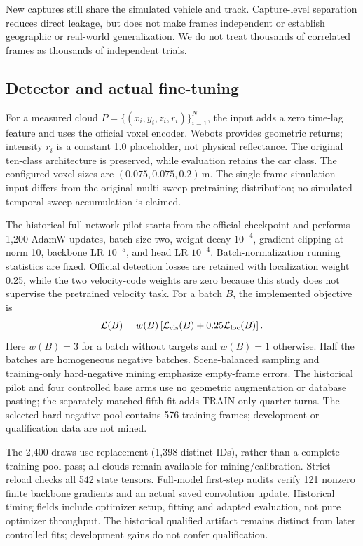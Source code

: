 \documentclass[conference]{IEEEtran}
\begin{document}
New captures still share the simulated vehicle and track. Capture-level separation reduces direct leakage, but does not make frames independent or establish geographic or real-world generalization. We do not treat thousands of correlated frames as thousands of independent trials.

\subsection{Detector and actual fine-tuning}
For a measured cloud $P=\{(x_i,y_i,z_i,r_i)\}_{i=1}^{N}$, the input adds a zero time-lag feature and uses the official voxel encoder. Webots provides geometric returns; intensity $r_i$ is a constant 1.0 placeholder, not physical reflectance. The original ten-class architecture is preserved, while evaluation retains the car class. The configured voxel sizes are $(0.075,0.075,0.2)$\,m. The single-frame simulation input differs from the original multi-sweep pretraining distribution; no simulated temporal sweep accumulation is claimed.

The historical full-network pilot starts from the official checkpoint and performs 1,200 AdamW updates, batch size two, weight decay $10^{-4}$, gradient clipping at norm 10, backbone LR $10^{-5}$, and head LR $10^{-4}$. Batch-normalization running statistics are fixed. Official detection losses are retained with localization weight 0.25, while the two velocity-code weights are zero because this study does not supervise the pretrained velocity task. For a batch $B$, the implemented objective is
\begin{equation}
\mathcal{L}(B)=w(B)\left[\mathcal{L}_{\rm cls}(B)+0.25\mathcal{L}_{\rm loc}(B)\right].
\end{equation}
Here $w(B)=3$ for a batch without targets and $w(B)=1$ otherwise. Half the batches are homogeneous negative batches. Scene-balanced sampling and training-only hard-negative mining emphasize empty-frame errors. The historical pilot and four controlled base arms use no geometric augmentation or database pasting; the separately matched fifth fit adds TRAIN-only quarter turns. The selected hard-negative pool contains 576 training frames; development or qualification data are not mined.

The 2,400 draws use replacement (1,398 distinct IDs), rather than a complete training-pool pass; all clouds remain available for mining/calibration. Strict reload checks all 542 state tensors. Full-model first-step audits verify 121 nonzero finite backbone gradients and an actual saved convolution update. Historical timing fields include optimizer setup, fitting and adapted evaluation, not pure optimizer throughput. The historical qualified artifact remains distinct from later controlled fits; development gains do not confer qualification.
\end{document}
